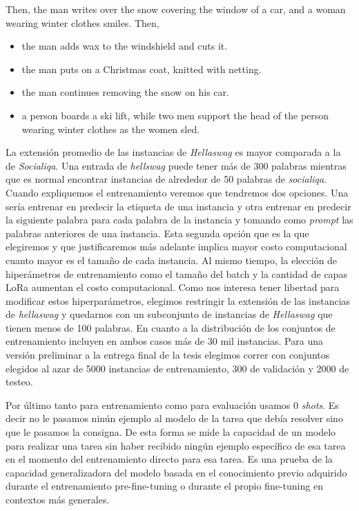 \documentclass{book}
\begin{document}
\begin{center}
\begin{mdframed}
\small %
Then, the man writes over the snow covering the window of a car, and a woman wearing winter clothes smiles. Then,
\begin{itemize}
    \item the man adds wax to the windshield and cuts it.
    \item the man puts on a Christmas coat, knitted with netting.
    \item the man continues removing the snow on his car.
    \item a person boards a ski lift, while two men support the head of the person wearing winter clothes as the women sled.
\end{itemize}
\end{mdframed}
\end{center}
La extensión promedio de las instancias de \textit{Hellaswag} es mayor comparada a la de \textit{Socialiqa}. Una entrada de \textit{hellswag} puede tener más de 300 palabras mientras que es normal encontrar instancias de alrededor de 50 palabras de \textit{socialiqa}. Cuando expliquemos el entrenamiento veremos que tendremos dos opciones. Una sería entrenar en predecir la etiqueta de una instancia y otra entrenar en predecir la siguiente palabra para cada palabra de la instancia y tomando como \textit{prompt} las palabras anteriores de una instancia. Esta segunda opción que es la que elegiremos y que justificaremos más adelante implica mayor costo computacional cuanto mayor es el tamaño de cada instancia. Al mismo tiempo, la elección de hiperámetros de entrenamiento como el tamaño del batch y la cantidad de capas LoRa aumentan el costo computacional. Como nos interesa tener libertad para modificar estos hiperparámetros, elegimos restringir la extensión de las instancias de \textit{hellaswag} y quedarnos con un subconjunto de instancias de \textit{Hellaswag} que tienen menos de 100 palabras. 
En cuanto a la distribución de los conjuntos de entrenamiento incluyen en ambos casos más de 30 mil instancias. Para una versión preliminar a la entrega final de la tesis elegimos correr con conjuntos elegidos al azar de 5000 instancias de entrenamiento, 300 de validación y 2000 de testeo.

Por último tanto para entrenamiento como para evaluación usamos 0 \textit{shots}. Es decir no le pasamos ninún ejemplo al modelo de la tarea que debía resolver sino que le pasamos la consigna. De esta forma se mide la capacidad de un modelo para realizar una tarea sin haber recibido ningún ejemplo específico de esa tarea en el momento del entrenamiento directo para esa tarea. Es una prueba de la capacidad generalizadora del modelo basada en el conocimiento previo adquirido durante el entrenamiento pre-fine-tuning o durante el propio fine-tuning en contextos más generales.
\end{document}
